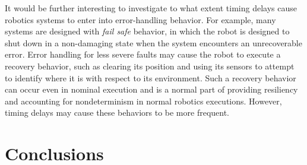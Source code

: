 \documentclass[conference]{IEEEtran}
\newcommand{\todo}[1]{\textcolor{violet}{{\bfseries [[TODO: #1]]}}}
\begin{document}
It would be further interesting to investigate to what extent timing delays cause
robotics systems to enter into error-handling behavior.
For example, many systems are designed with \emph{fail safe} behavior, in which
the robot is designed to shut down in a non-damaging state when the system encounters
an unrecoverable error.
Error handling for less severe faults may cause the robot to execute a recovery
behavior, such as clearing its position and using its sensors to attempt to
identify where it is with respect to its environment.
Such a recovery behavior can occur even in nominal execution and is a normal part
of providing resiliency and accounting for nondeterminism in normal robotics executions.
However, timing delays may cause these behaviors to be more frequent.

\section{Conclusions}






\end{document}
